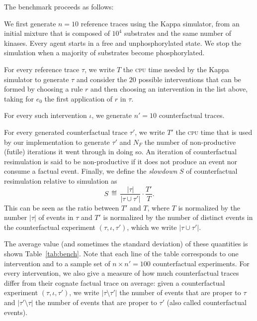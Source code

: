 The benchmark proceeds as follows:
\begin{inparaenum}[(i)]
\item We first generate $n=10$ reference traces using the Kappa
  simulator, from an initial mixture that is composed of $10^4$
  substrates and the same number of kinases. Every agent starts in a
  free and unphosphorylated state. We stop the simulation when a
  majority of substrates become phosphorylated.
\item For every reference trace $\tau$, we write $T$ the \textsc{cpu} time
  needed by the Kappa simulator to generate $\tau$ and consider the
  $20$ possible interventions that can be formed by choosing a rule
  $r$ and then choosing an intervention in the list above, taking for
  $e_0$ the first application of $r$ in $\tau$.
\item For every such intervention $\iota$, we generate $n' = 10$
  counterfactual traces.
\item For every generated counterfactual trace $\tau'$, we write $T'$
  the \textsc{cpu} time that is used by our implementation to generate
  $\tau'$ and $N_F$ the number of non-productive (futile) iterations
  it went through in doing so. An iteration of counterfactual
  resimulation is said to be non-productive if it does not produce an
  event nor consume a factual event. Finally, we define the
  \textit{slowdown} $S$ of counterfactual resimulation relative to
  simulation as
  \[ S \,\eqdef\, \frac{|\tau|}{|\tau \cup \tau'|} \cdot
    \frac{T'}{T}. \] This can be seen as the ratio between $T'$ and
  $T$, where $T$ is normalized by the number $|\tau|$ of events in
  $\tau$ and $T'$ is normalized by the number of distinct events in
  the counterfactual experiment $(\tau, \iota, \tau')$, which we write
  $|\tau \cup \tau'|$.

  The average value (and sometimes the standard deviation) of these
  quantities is shown Table~\ref{tab:bench}. Note that each line of
  the table corresponds to one intervention and to a sample set of
  $n \times n' = 100$ counterfactual experiments. For every intervention, we
  also give a measure of how much counterfactual traces differ from
  their cognate factual trace on average: given a counterfactual
  experiment $(\tau, \iota, \tau')$, we write
  $|\tau \!\setminus\! \tau'|$ the number of events that are proper to
  $\tau$ and $|\tau' \!\setminus\! \tau|$ the number of events that
  are proper to $\tau'$ (also called counterfactual events).
\end{inparaenum}

